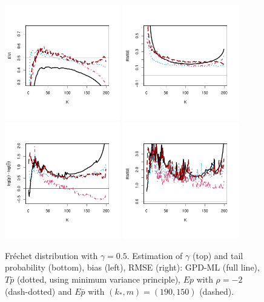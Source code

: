  \begin{figure}[!ht]
 \centering
\includegraphics[width=0.45\textwidth]{./plots/paper3/frechetGPD_evi.pdf} 
\includegraphics[width=0.45\textwidth]{./plots/paper3/frechetGPD_rmse.pdf} \\
\includegraphics[width=0.45\textwidth]{./plots/paper3/frechetGPD_tail.pdf}
\includegraphics[width=0.45\textwidth]{./plots/paper3/frechetGPD_tail_rmse.pdf} 
 \caption{ Fr\'echet distribution with $\gamma=0.5$. Estimation of $\gamma$ (top) and tail probability (bottom), bias (left), RMSE (right): GPD-ML (full line), $T\bar{p}$ (dotted, using minimum variance principle), $Ep$ with $\rho=-2$ (dash-dotted) and $E\bar{p}$ with $(k_*,m)=(190,150)$ (dashed). }
\label{paper3:fig4}
\end{figure}
